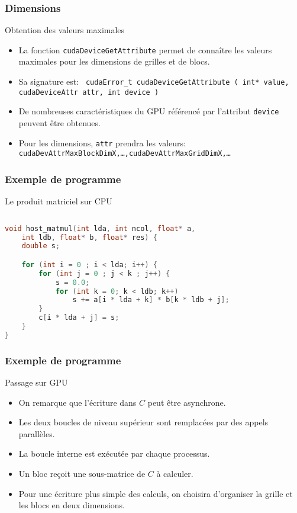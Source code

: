 \begin{frame}
    \frametitle{Dimensions}
\begin{block}{Obtention des valeurs maximales}
    \begin{itemize}
          \item<+-> La fonction \texttt{cudaDeviceGetAttribute} permet de connaître les valeurs maximales pour les dimensions de grilles
          et de blocs.
          \item<+-> Sa signature est:
        {\footnotesize \nvhost \nvdevice \texttt{ cudaError\_t cudaDeviceGetAttribute ( int* value, cudaDeviceAttr attr, int  device )}}
          \item<+-> De nombreuses caractéristiques du GPU référencé par l'attribut \texttt{device} peuvent être obtenues.
          \item<+-> Pour les dimensions,  \texttt{attr} prendra les valeurs: 
          {\footnotesize \texttt{cudaDevAttrMaxBlockDimX,\dots,cudaDevAttrMaxGridDimX,\dots }}
    \end{itemize}
\end{block}
\end{frame}
\begin{frame}[fragile]
    \frametitle{Exemple de programme}
\begin{block}{Le produit matriciel sur CPU}
    \begin{lstlisting}[basicstyle=\footnotesize,tabsize=4,language=c++]
  
void host_matmul(int lda, int ncol, float* a, 
    int ldb, float* b, float* res) {
	double s;

	for (int i = 0 ; i < lda; i++) {
		for (int j = 0 ; j < k ; j++) {
			s = 0.0;
			for (int k = 0; k < ldb; k++)
				s += a[i * lda + k] * b[k * ldb + j];
		}
		c[i * lda + j] = s;
	}
}
\end{lstlisting}
\end{block}
\end{frame}

\begin{frame}
    \frametitle{Exemple de programme}
\begin{block}{Passage sur GPU}
    \begin{itemize}
        \item<+-> On remarque que l'écriture dans $C$ peut être asynchrone.
        \item<+-> Les deux boucles de niveau supérieur sont remplacées par des appels parallèles.
        \item<+-> La boucle interne est exécutée par chaque processus.
        \item<+-> Un bloc reçoit une sous-matrice de $C$ à calculer.
        \item<+-> Pour une écriture plus simple des calculs, on choisira d'organiser la grille et les 
        blocs en deux dimensions.
    \end{itemize}
\end{block}
\end{frame}

